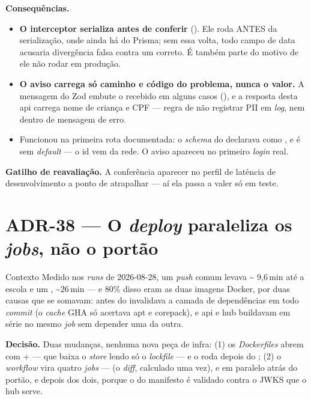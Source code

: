 \textbf{Consequências.}
\begin{itemize}
  \item \textbf{O interceptor serializa antes de conferir}
    (). Ele roda ANTES da serialização, onde
    ainda há  do Prisma; sem essa volta, todo campo de data acusaria
    divergência falsa contra um  correto. É também
    parte do motivo de ele não rodar em produção.
  \item \textbf{O aviso carrega só caminho e código do problema, nunca o valor.}
    A mensagem do Zod embute o recebido em alguns casos
    (), e a resposta desta api carrega nome de criança e
    CPF --- regra de não registrar PII em \emph{log}, nem dentro de mensagem de
    erro.
  \item Funcionou na primeira rota documentada: o \emph{schema} do
     declarava  como , e
     é  sem \emph{default} --- o id vem da rede. O
    aviso apareceu no primeiro \emph{login} real.
\end{itemize}

\textbf{Gatilho de reavaliação.} A conferência aparecer no perfil de latência de
desenvolvimento a ponto de atrapalhar --- aí ela passa a valer só em teste.

\section{ADR-38 --- O \emph{deploy} paraleliza os \emph{jobs}, não o portão}
\label{adr:deploy-paralelo}

\begin{especificacao}{Contexto}
Medido nos \emph{runs} de 2026-08-28, um \emph{push} comum levava \textasciitilde
9,6\,min até a escola e um , \textasciitilde 26\,min --- e 80\% disso
eram as duas imagens Docker, por duas causas que se somavam:  antes
do  invalidava a camada de dependências em todo \emph{commit}
(o \emph{cache} GHA só acertava apt e corepack), e api e hub buildavam em série
no mesmo \emph{job} sem depender uma da outra.
\end{especificacao}

\textbf{Decisão.} Duas mudanças, nenhuma nova peça de infra: (1) os
\emph{Dockerfiles} abrem com  +
 --- que baixa o \emph{store} lendo só o \emph{lockfile} --- e o
 roda depois do ; (2) o \emph{workflow}
vira quatro \emph{jobs} ---  (o \emph{diff}, calculado uma vez),
 e  em paralelo atrás do portão, e
 depois dos dois, porque o  do manifesto é validado
contra o JWKS que o hub serve.

